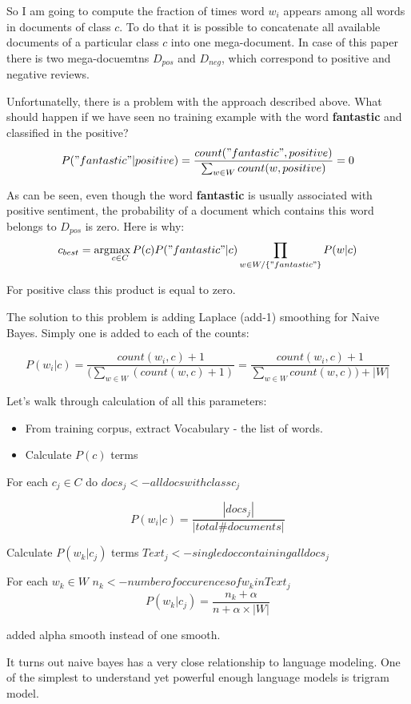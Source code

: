 \documentclass[12pt]{report}
\begin{document}
So I am going to compute the fraction of times word $w_i$ appears among all words in documents of class $c$. To do that it is possible to concatenate all available documents of a particular class $c$ into one mega-document. In case of this paper there is two mega-docuemtns $D_{pos}$ and $D_{neg}$, which correspond to positive and negative reviews.

Unfortunatelly, there is a problem with the approach described above. What should happen if we have seen no training example with the word \textbf{fantastic} and classified in the positive?
$$P("fantastic" | positive) = \dfrac{count("fantastic", positive)}{\sum_{w \in W} {count(w, positive)}} = 0$$

As can be seen, even though the word \textbf{fantastic} is usually associated with positive sentiment, the probability of a document which contains this word belongs to $D_{pos}$ is zero. Here is why:
$$c_{best} = \arg\!\max_{c \in C} P(c) P("fantastic" | c) \prod_{w \in W/\{"fantastic"\}} {P(w | c) }$$

For positive class this product is equal to zero.

The solution to this problem is adding Laplace (add-1) smoothing for Naive Bayes. Simply one is added to each of the counts:

$$P(w_i | c) = \dfrac{count(w_i, c) + 1}{(\sum_{w \in W} {(count(w, c) + 1)}} = \dfrac{count(w_i, c) + 1}{\sum_{w \in W} {count(w, c)}) + |W|}$$

Let's walk through calculation of all this parameters:

\begin{itemize}
  \item From training corpus, extract Vocabulary - the list of words.
  \item Calculate $P(c)$ terms
\end{itemize}

For each $c_j \in C$ do
$docs_j <- all docs with class c_j$ 

$$P(w_i | c) = \dfrac{|docs_j|}{|total \# documents|}$$

Calculate $P(w_k | c_j)$ terms
$Text_j <- single doc containing all docs_j$

For each $w_k \in W$
$n_k <- number of occurences of w_k in Text_j$
$$P(w_k | c_j) = \dfrac{n_k + \alpha}{n + \alpha \times |W|}$$

added alpha smooth instead of one smooth.


It turns out naive bayes has a very close relationship to language modeling. One of the simplest to understand yet powerful enough language models is trigram model.
\end{document}
